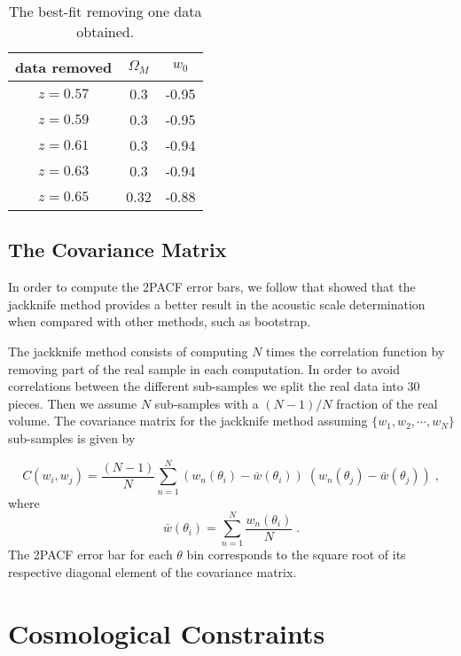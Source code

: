 \documentclass[a4paper,11pt]{article}
\begin{document}
\begin{table}
\centering
\begin{tabular}{| c | c | c |}
\hline
data removed  & $\Omega_M$ & $w_0$ \\
\hline
$z=0.57$ & 0.3 & -0.95 \\
\hline
$z=0.59$ & 0.3 & -0.95 \\
\hline
$z=0.61$ & 0.3 & -0.94 \\
\hline
$z=0.63$ & 0.3 & -0.94 \\
\hline
$z=0.65$ & 0.32 & -0.88 \\
\hline
\end{tabular}
\caption{The best-fit removing one data obtained.}
\label{table8}
\end{table}

\subsection{\label{sec:level2.1} The Covariance Matrix}

In order to compute the 2PACF error bars, we follow \cite{deCarvalho} that showed that the jackknife method provides a better result in the acoustic scale determination when compared with other methods, such as bootstrap. 



The jackknife method consists of computing $N$ times the correlation function  by removing part of the real sample in each computation.  In order to avoid correlations between the different sub-samples we split the real data into 30 pieces. Then we assume $N$ sub-samples with a $(N-1)/N$ fraction of the real volume.  The covariance matrix for the jackknife method assuming $\{w_1,w_2, \cdots, w_N\}$ sub-samples is given by

\begin{equation}
C(w_i,w_j)=\frac{(N-1)}{N} \sum_{n=1}^{N}(w_n(\theta_i)-\bar{w}(\theta_i)) \; (w_n(\theta_j)-\bar{w}(\theta_j))\;,
\end{equation}
where
\begin{equation}
\bar{w}(\theta_i)=\sum_{n=1}^{N}\frac{w_n(\theta_i)}{N}\;.
\end{equation}
The 2PACF error bar for each $\theta$ bin corresponds to the square root of its respective diagonal element of the covariance matrix.

\section{Cosmological Constraints} 
\label{sec5}
\end{document}
